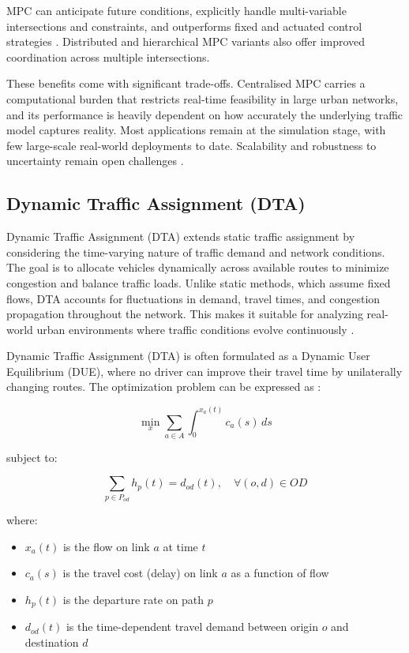 \documentclass[11pt, a4paper]{report}
\begin{document}
MPC can anticipate future conditions, explicitly handle multi-variable intersections and constraints, and outperforms fixed and actuated control strategies \cite{8707103}. Distributed and hierarchical MPC variants also offer improved coordination across multiple intersections.

These benefits come with significant trade-offs. Centralised MPC carries a computational burden that restricts real-time feasibility in large urban networks, and its performance is heavily dependent on how accurately the underlying traffic model captures reality. Most applications remain at the simulation stage, with few large-scale real-world deployments to date. Scalability and robustness to uncertainty remain open challenges \cite{8707103}.

\subsection{Dynamic Traffic Assignment (DTA)}

Dynamic Traffic Assignment (DTA) extends static traffic assignment by considering the time-varying nature of traffic demand and network conditions. The goal is to allocate vehicles dynamically across available routes to minimize congestion and balance traffic loads. Unlike static methods, which assume fixed flows, DTA accounts for fluctuations in demand, travel times, and congestion propagation throughout the network. This makes it suitable for analyzing real-world urban environments where traffic conditions evolve continuously \cite{elimadi2024review}.

Dynamic Traffic Assignment (DTA) is often formulated as a Dynamic User Equilibrium (DUE), where no driver can improve their travel time by unilaterally changing routes. The optimization problem can be expressed as \cite{elimadi2024review}:

\begin{equation}
\min_{x} \sum_{a \in A} \int_{0}^{x_a(t)} c_a(s)\,ds
\label{eq:dta-objective}
\end{equation}

subject to:

\begin{equation}
\sum_{p \in P_{od}} h_p(t) = d_{od}(t), \quad \forall (o,d) \in OD
\label{eq:dta-constraint}
\end{equation}

where:

\begin{itemize}
    \item $x_a(t)$ is the flow on link $a$ at time $t$
    \item $c_a(s)$ is the travel cost (delay) on link $a$ as a function of flow
    \item $h_p(t)$ is the departure rate on path $p$
    \item $d_{od}(t)$ is the time-dependent travel demand between origin $o$ and destination $d$
\end{itemize}
\end{document}
